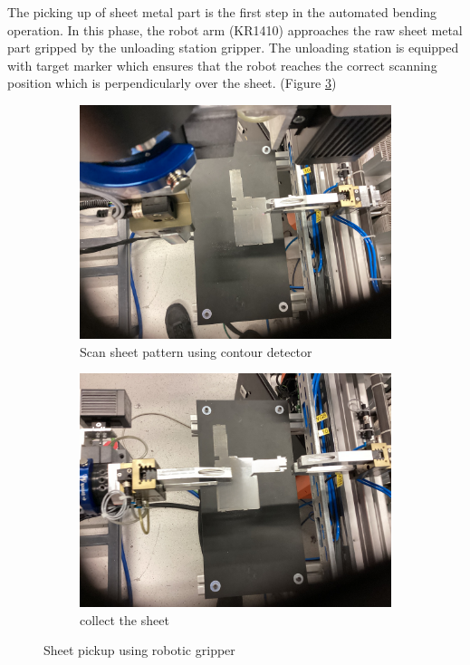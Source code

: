 The picking up of sheet metal part is the first step in the automated bending operation. In this phase, the robot arm (KR1410) approaches the raw sheet metal part gripped by the unloading station gripper. The unloading station is equipped with target marker which ensures that the robot reaches the correct scanning position which is perpendicularly over the sheet. (Figure \ref{fig:sheet-pickup})


\begin{figure}[h]
    \centering
    \begin{subfigure}[b]{0.48\textwidth}
        \centering
        \includegraphics[width=\textwidth]{figures/sheet-pickup/scan.png}
        \caption{Scan sheet pattern using contour detector}
        \label{subfig:sheet-scan}
    \end{subfigure}\hspace{0.1cm}
    \begin{subfigure}[b]{0.48\textwidth}
        \centering
        \includegraphics[width=\textwidth]{figures/sheet-pickup/taken.png}
        \caption{collect the sheet}
        \label{subfig:sheet-taken}
    \end{subfigure}
    \caption{Sheet pickup using robotic gripper}
    \label{fig:sheet-pickup}
\end{figure}


